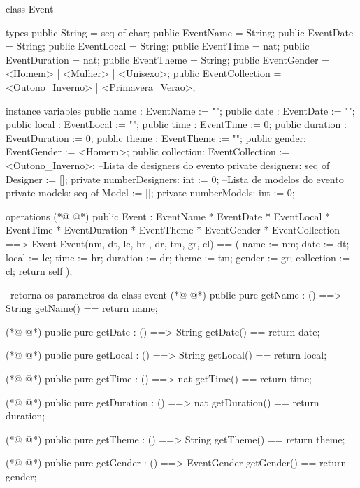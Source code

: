 \begin{vdmpp}[breaklines=true]
class Event
 
types
 public String = seq of char; 
 public EventName = String;
 public EventDate = String;
 public EventLocal = String;
 public EventTime = nat;
 public EventDuration = nat;
 public EventTheme = String;
 public EventGender = <Homem> | <Mulher> | <Unisexo>;
  public EventCollection = <Outono_Inverno> | <Primavera_Verao>;

instance variables
 public  name : EventName := "";
 public  date : EventDate := "";
 public  local : EventLocal := "";
 public  time : EventTime := 0;
 public  duration : EventDuration := 0;
 public  theme : EventTheme := "";
 public  gender: EventGender := <Homem>;
 public  collection: EventCollection := <Outono_Inverno>;
 --Lista de designers do evento
 private  designers: seq of Designer := [];
 private  numberDesigners: int := 0;
 --Lista de modelos do evento
 private  models: seq of Model := [];
 private  numberModels: int := 0;
 
operations
(*@
\label{Event:31}
@*)
 public Event : 
         EventName * 
         EventDate *
         EventLocal *
         EventTime *
         EventDuration *
         EventTheme *
         EventGender *  
         EventCollection ==> Event
 Event(nm, dt, lc, hr , dr, tm, gr, cl) == (
  name := nm;
  date := dt;
  local := lc;
  time := hr;
  duration := dr;
  theme := tm;
  gender := gr;
  collection := cl;
  return self
 );
 
 --retorna os parametros da class event
(*@
\label{getName:53}
@*)
  public pure getName : () ==> String
    getName() == return name;
    
(*@
\label{getDate:56}
@*)
   public pure getDate : () ==> String
     getDate() == return date;
     
(*@
\label{getLocal:59}
@*)
  public pure getLocal : () ==> String
     getLocal() == return local;
     
(*@
\label{getTime:62}
@*)
  public pure getTime : () ==> nat
     getTime() == return time;      
     
(*@
\label{getDuration:65}
@*)
  public pure getDuration : () ==> nat
     getDuration() == return duration;
     
(*@
\label{getTheme:68}
@*)
  public pure getTheme : () ==> String
     getTheme() == return theme;
     
(*@
\label{getGender:71}
@*)
  public pure getGender : () ==> EventGender
     getGender() == return gender;
     

\end{vdmpp}
